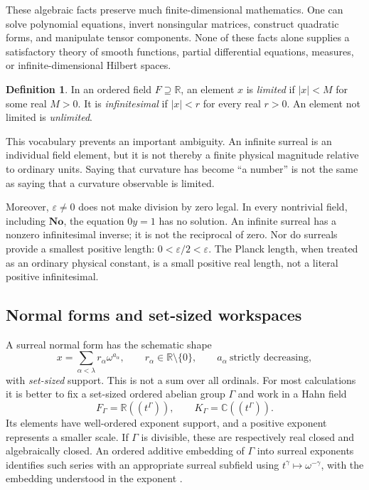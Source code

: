 \documentclass[11pt,letterpaper]{article}
\newcommand{\No}{\mathbf{No}}
\newcommand{\R}{\mathbb{R}}
\newcommand{\C}{\mathbb{C}}
\newcommand{\eps}{\varepsilon}
\theoremstyle{definition}
\newtheorem{definition}[proposition]{Definition}
\theoremstyle{remark}
\begin{document}
These algebraic facts preserve much finite-dimensional mathematics. One can
solve polynomial equations, invert nonsingular matrices, construct quadratic
forms, and manipulate tensor components. None of these facts alone supplies
a satisfactory theory of smooth functions, partial differential equations,
measures, or infinite-dimensional Hilbert spaces.

\begin{definition}
In an ordered field $F\supseteq\R$, an element $x$ is \emph{limited} if
$|x|<M$ for some real $M>0$. It is \emph{infinitesimal} if $|x|<r$ for every
real $r>0$. An element not limited is \emph{unlimited}.
\end{definition}

This vocabulary prevents an important ambiguity. An infinite surreal is an
individual field element, but it is not thereby a finite physical magnitude
relative to ordinary units. Saying that curvature has become ``a number'' is
not the same as saying that a curvature observable is limited.

Moreover, $\eps\neq0$ does not make division by zero legal. In every nontrivial
field, including $\No$, the equation $0y=1$ has no solution. An infinite surreal
has a nonzero infinitesimal inverse; it is not the reciprocal of zero. Nor do
surreals provide a smallest positive length: $0<\eps/2<\eps$. The Planck length,
when treated as an ordinary physical constant, is a small positive real length,
not a literal positive infinitesimal.

\subsection{Normal forms and set-sized workspaces}

A surreal normal form has the schematic shape
\[
 x=\sum_{\alpha<\lambda}r_\alpha\omega^{a_\alpha},
 \qquad r_\alpha\in\R\setminus\{0\},
 \qquad a_\alpha\ \text{strictly decreasing},
\]
with \emph{set-sized} support. This is not a sum over all ordinals. For most
calculations it is better to fix a set-sized ordered abelian group $\Gamma$ and
work in a Hahn field
\[
 F_\Gamma=\R((t^\Gamma)),\qquad
 K_\Gamma=\C((t^\Gamma)).
\]
Its elements have well-ordered exponent support, and a positive exponent
represents a smaller scale. If $\Gamma$ is divisible, these are respectively
real closed and algebraically closed. An ordered additive embedding of
$\Gamma$ into surreal exponents identifies such series with an appropriate
surreal subfield using $t^\gamma\mapsto\omega^{-\gamma}$, with the embedding
understood in the exponent \cite{Conway,Gonshor,RepoDocs}.
\end{document}
